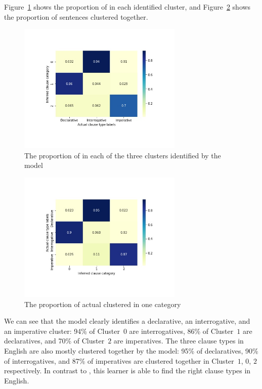Figure~\ref{fig:target-heatmap} shows the proportion of \diis{} in each identified cluster, and Figure~\ref{fig:target-heatrev} shows the proportion of sentences clustered together. 
\begin{figure}[H]
    \centering
    \includegraphics[width=0.7\textwidth]{figures/target-heatmap.jpg}
    \caption{The proportion of \diis{} in each of the three clusters identified by the \plearnerabbr{} model}
    \label{fig:target-heatmap}
\end{figure}




\begin{figure}[H]
    \centering
    \includegraphics[width=0.7\textwidth]{figures/target-heatrev.jpg}
    \caption{The proportion of actual \diis{} clustered in one category}
    \label{fig:target-heatrev}
\end{figure}


We can see that the \plearnerabbr{} model clearly identifies a declarative, an interrogative, and an imperative cluster: 94\% of Cluster~$0$ are interrogatives, 86\% of Cluster~$1$ are declaratives, and 70\% of Cluster~$2$ are imperatives. The three clause types in English are also mostly clustered together by the model: 95\% of declaratives, 90\% of interrogatives, and 87\% of imperatives are clustered together in Cluster~$1$, $0$, $2$ respectively. In contrast to \dlearnerabbr{}, this learner is able to find the right clause types in English.


